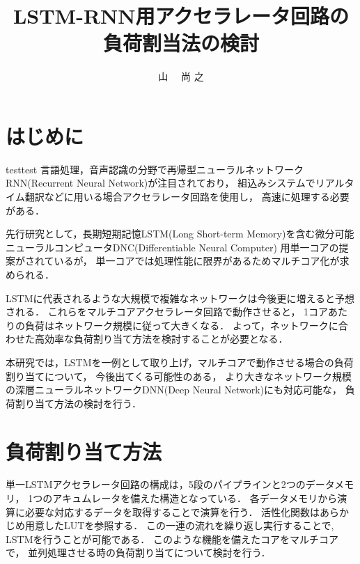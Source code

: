 \documentclass[a4j]{jarticle}
\title{LSTM-RNN用アクセラレータ回路の負荷割当法の検討}
\author{山 \UTF{FA11} ~~尚 之}
\begin{document}
\begin{Abstract}

 \section{はじめに}
 testtest
言語処理，音声認識の分野で再帰型ニューラルネットワークRNN(Recurrent Neural Network)が注目されており，
組込みシステムでリアルタイム翻訳などに用いる場合アクセラレータ回路を使用し，
高速に処理する必要がある．

先行研究として，長期短期記憶LSTM(Long Short-term Memory)を含む微分可能ニューラルコンピュータDNC(Differentiable Neural Computer)
用単一コアの提案\cite{bib:pre-method}がされているが，
単一コアでは処理性能に限界があるためマルチコア化が求められる．

LSTMに代表されるような大規模で複雑なネットワークは今後更に増えると予想される．
これらをマルチコアアクセラレータ回路で動作させると，
1コアあたりの負荷はネットワーク規模に従って大きくなる．
よって，ネットワークに合わせた高効率な負荷割り当て方法を検討することが必要となる．

本研究では，LSTMを一例として取り上げ，マルチコアで動作させる場合の負荷割り当てについて，
今後出てくる可能性のある，
より大きなネットワーク規模の深層ニューラルネットワークDNN(Deep Neural Network)にも対応可能な，
負荷割り当て方法の検討を行う．


 \section{負荷割り当て方法}
単一LSTMアクセラレータ回路の構成は，5段のパイプラインと2つのデータメモリ，
1つのアキュムレータを備えた構造となっている．
各データメモリから演算に必要な対応するデータを取得することで演算を行う．
活性化関数はあらかじめ用意したLUTを参照する．
この一連の流れを繰り返し実行することで,
LSTMを行うことが可能である．
このような機能を備えたコアをマルチコアで，
並列処理させる時の負荷割り当てについて検討を行う．


\end{Abstract}
\end{document}
